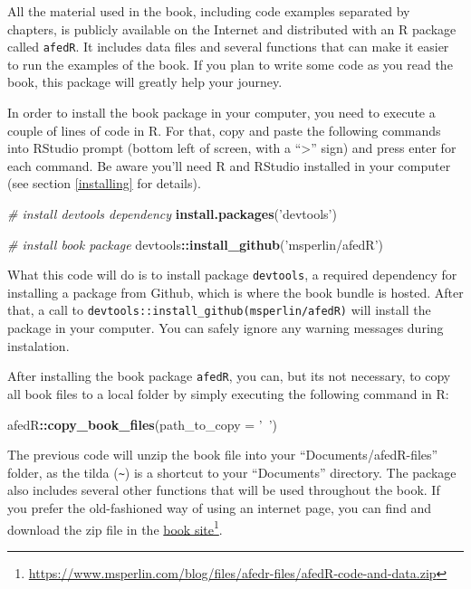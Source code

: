 \documentclass[
  12pt,
]{book}
\newenvironment{Shaded}{\begin{snugshade}}{\end{snugshade}}
\newcommand{\CommentTok}[1]{\textcolor[rgb]{0.37,0.37,0.37}{\textit{#1}}}
\newcommand{\DataTypeTok}[1]{\textcolor[rgb]{0.27,0.27,0.27}{#1}}
\newcommand{\KeywordTok}[1]{\textcolor[rgb]{0.27,0.27,0.27}{\textbf{#1}}}
\newcommand{\NormalTok}[1]{#1}
\newcommand{\OperatorTok}[1]{\textcolor[rgb]{0.43,0.43,0.43}{\textbf{#1}}}
\newcommand{\StringTok}[1]{\textcolor[rgb]{0.5,0.5,0.5}{#1}}
\begin{document}
All the material used in the book, including code examples separated by chapters, is publicly available on the Internet and distributed with an R package called \texttt{afedR}. It includes data files and several functions that can make it easier to run the examples of the book. If you plan to write some code as you read the book, this package will greatly help your journey.

In order to install the book package in your computer, you need to execute a couple of lines of code in R. For that, copy and paste the following commands into RStudio prompt (bottom left of screen, with a ``\textgreater{}'' sign) and press enter for each command. Be aware you'll need R and RStudio installed in your computer (see section \ref{installing} for details).

\begin{Shaded}
\begin{Highlighting}[]
\CommentTok{# install devtools dependency}
\KeywordTok{install.packages}\NormalTok{(}\StringTok{'devtools'}\NormalTok{)}

\CommentTok{# install book package}
\NormalTok{devtools}\OperatorTok{::}\KeywordTok{install_github}\NormalTok{(}\StringTok{'msperlin/afedR'}\NormalTok{)}
\end{Highlighting}
\end{Shaded}

What this code will do is to install package \texttt{devtools}, a required dependency for installing a package from Github, which is where the book bundle is hosted. After that, a call to \texttt{devtools::install\_github(\textquotesingle{}msperlin/afedR\textquotesingle{})} will install the package in your computer. You can safely ignore any warning messages during instalation.

After installing the book package \texttt{afedR}, you can, but its not necessary, to copy all book files to a local folder by simply executing the following command in R:

\begin{Shaded}
\begin{Highlighting}[]
\NormalTok{afedR}\OperatorTok{::}\KeywordTok{copy_book_files}\NormalTok{(}\DataTypeTok{path_to_copy =} \StringTok{'~'}\NormalTok{)}
\end{Highlighting}
\end{Shaded}

The previous code will unzip the book file into your ``Documents/afedR-files'' folder, as the tilda (\texttt{\textasciitilde{}}) is a shortcut to your ``Documents'' directory. The package also includes several other functions that will be used throughout the book. If you prefer the old-fashioned way of using an internet page, you can find and download the zip file in the \href{https://www.msperlin.com/blog/files/afedr-files/afedR-code-and-data.zip}{book site}\footnote{\url{https://www.msperlin.com/blog/files/afedr-files/afedR-code-and-data.zip}}.
\end{document}

